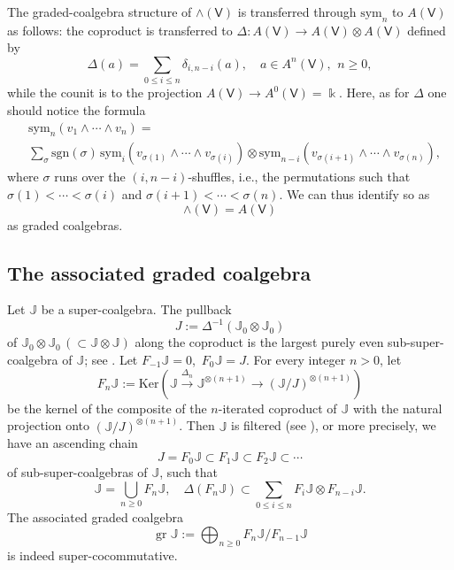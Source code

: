 \documentclass[11pt, a4paper]{amsart}
\theoremstyle{definition}
\numberwithin{equation}{section}
\begin{document}
The graded-coalgebra structure of $\wedge(\mathsf{V})$ is transferred through $\mathrm{sym}_{n}$ to $A(\mathsf{V})$
as follows: 
the coproduct is transferred to $\Delta: A(\mathsf{V}) \to A(\mathsf{V}) \otimes A(\mathsf{V})$ defined by
\[ \Delta(a) = \sum_{0 \leq i \leq n} \delta_{i, n-i}(a),\quad a \in A^{n}(\mathsf{V}),\ \, n \geq 0, \]
while the counit is to the projection $A(\mathsf{V}) \to A^{0}(\mathsf{V}) = \Bbbk$.
Here, as for $\Delta$ one should notice the formula
\[ 
\begin{split}
&\mathrm{sym}_{n}(v_{1} \wedge \cdots \wedge v_{n} ) =\\ 
&\sum_{\sigma} \mathrm{sgn}(\sigma)\, \mathrm{sym}_{i}(v_{\sigma(1)} \wedge \cdots \wedge v_{\sigma(i)}) \otimes \mathrm{sym}_{n-i}(v_{\sigma(i+1)} \wedge \cdots \wedge v_{\sigma(n)}), 
\end{split}
\]
where $\sigma$ runs over the $(i, n-i)$-shuffles, i.e., the permutations such that $\sigma(1) <\cdots< \sigma(i)$ 
and $\sigma(i+1) <\cdots< \sigma(n)$.
We can thus identify so as
\begin{equation}\label{E24}
\wedge(\mathsf{V}) = A(\mathsf{V})
\end{equation}
as graded coalgebras.


\subsection{The associated graded coalgebra}\label{Subsec2.4}
Let $\mathbb{J}$ be a super-coalgebra.
The pullback
\begin{equation}\label{E25}
J := \Delta^{-1} (\mathbb{J}_{0} \otimes \mathbb{J}_{0})
\end{equation}
of $\mathbb{J}_{0} \otimes \mathbb{J}_{0}\, (\subset \mathbb{J} \otimes \mathbb{J})$ along the coproduct is the largest purely even sub-super-coalgebra of $\mathbb{J}$; see \cite[Sect.~3]{M2}.
Let $F_{-1}\mathbb{J} = 0$,\ $F_{0} \mathbb{J} = J$.
For every integer $n>0$, let
\[ F_{n}\mathbb{J} := \mathrm{Ker}(\mathbb{J} \xrightarrow{\Delta_{n}} \mathbb{J}^{\otimes (n+1)} \rightarrow (\mathbb{J}/J)^{\otimes (n+1)}) \]
be the kernel of the composite of the $n$-iterated coproduct of $\mathbb{J}$ with the natural projection onto $(\mathbb{J}/J)^{\otimes (n+1)}$.
Then $\mathbb{J}$ is filtered (see \cite[Sect. 11.1]{Sw}), or more precisely, we have an ascending chain
\[ J = F_{0}\mathbb{J} \subset F_{1}\mathbb{J} \subset F_{2}\mathbb{J} \subset \cdots \]
of sub-super-coalgebras of $\mathbb{J}$, such that
\[ \mathbb{J} = \bigcup_{n \geq 0} F_{n}\mathbb{J},\quad \Delta(F_{n}\mathbb{J}) \subset \sum_{0 \leq i \leq n} F_{i}\mathbb{J} \otimes F_{n-i}\mathbb{J}. \]
The associated graded coalgebra
\[ \operatorname{gr}\mathbb{J} := \bigoplus_{n \geq 0}F_{n}\mathbb{J} / F_{n-1}\mathbb{J} \]
is indeed super-cocommutative.
\end{document}
